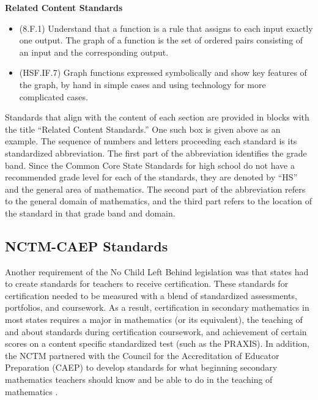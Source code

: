 \documentclass[
]{book}
\providecommand{\tightlist}{%
  \setlength{\itemsep}{0pt}\setlength{\parskip}{0pt}}
\newenvironment{standards}{}{}
\theoremstyle{definition}
\theoremstyle{definition}
\theoremstyle{definition}
\theoremstyle{definition}
\theoremstyle{remark}
\begin{document}
\begin{standards}

\begin{center}
\textbf{Related Content Standards}

\end{center}

\begin{itemize}
\tightlist
\item
  (8.F.1) Understand that a function is a rule that assigns to each input exactly one output. The graph of a function is the set of ordered pairs consisting of an input and the corresponding output.
\item
  (HSF.IF.7) Graph functions expressed symbolically and show key features of the graph, by hand in simple cases and using technology for more complicated cases.
\end{itemize}

\end{standards}

Standards that align with the content of each section are provided in blocks with the title ``Related Content Standards.'' One such box is given above as an example. The sequence of numbers and letters proceeding each standard is its standardized abbreviation. The first part of the abbreviation identifies the grade band. Since the Common Core State Standards for high school do not have a recommended grade level for each of the standards, they are denoted by ``HS'' and the general area of mathematics. The second part of the abbreviation refers to the general domain of mathematics, and the third part refers to the location of the standard in that grade band and domain.

\hypertarget{nctm-caep-standards}{%
\subsection{NCTM-CAEP Standards}\label{nctm-caep-standards}}

Another requirement of the No Child Left Behind legislation was that states had to create standards for teachers to receive certification. These standards for certification needed to be measured with a blend of standardized assessments, portfolios, and coursework. As a result, certification in secondary mathematics in most states requires a major in mathematics (or its equivalent), the teaching of and about standards during certification coursework, and achievement of certain scores on a content specific standardized test (such as the PRAXIS). In addition, the NCTM partnered with the Council for the Accreditation of Educator Preparation (CAEP) to develop standards for what beginning secondary mathematics teachers should know and be able to do in the teaching of mathematics \citep{CAEP}.
\end{document}
